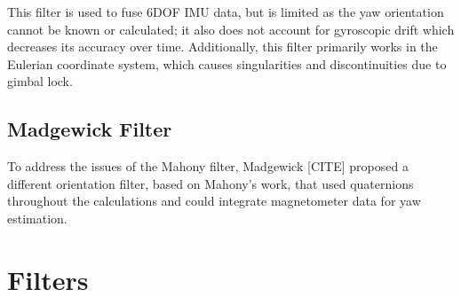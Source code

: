 This filter is used to fuse 6DOF IMU data, but is limited as the yaw orientation cannot be known or calculated; it also does not account for gyroscopic drift which decreases its accuracy over time.
Additionally, this filter primarily works in the Eulerian coordinate system, which causes singularities and discontinuities due to gimbal lock.

\subsection{Madgewick Filter}
To address the issues of the Mahony filter, Madgewick [CITE] proposed a different orientation filter, based on Mahony's work, that used quaternions throughout the calculations and could integrate magnetometer data for yaw estimation.


\section{Filters} \label{sec:bkg_filters}
